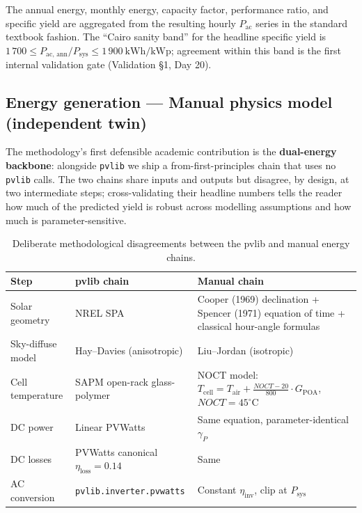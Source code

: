 The annual energy, monthly energy, capacity factor, performance
ratio, and specific yield are aggregated from the resulting hourly
$P_{\text{ac}}$ series in the standard textbook fashion. The
``Cairo sanity band'' for the headline specific yield is
$1\,700 \le P_{\text{ac, ann}} / P_{\text{sys}} \le 1\,900~\mathrm{kWh/kWp}$;
agreement within this band is the first internal validation gate
(Validation \S1, Day 20).

\subsection{Energy generation --- Manual physics model (independent twin)}
\label{sec:manual}

The methodology's first defensible academic contribution is the
\textbf{dual-energy backbone}: alongside \texttt{pvlib} we ship a
from-first-principles chain that uses no \texttt{pvlib} calls. The
two chains share inputs and outputs but disagree, by design, at two
intermediate steps; cross-validating their headline numbers tells the
reader how much of the predicted yield is robust across modelling
assumptions and how much is parameter-sensitive.

\begin{table}[!htbp]
\centering
\footnotesize
\setlength{\tabcolsep}{4pt}
\renewcommand{\arraystretch}{1.2}
\begin{tabularx}{\linewidth}{@{}l X X@{}}
\toprule
\textbf{Step} & \textbf{pvlib chain} & \textbf{Manual chain} \\
\midrule
Solar geometry    & NREL SPA \citep{nrel-spa}
                  & Cooper (1969) declination + Spencer (1971) equation of time + classical hour-angle formulas \citep{duffie} \\
Sky-diffuse model & Hay--Davies (anisotropic)
                  & Liu--Jordan (isotropic) \citep{liu1960} \\
Cell temperature  & SAPM open-rack glass-polymer
                  & NOCT model:
                    $T_{\text{cell}} = T_{\text{air}} + \frac{NOCT-20}{800} \cdot G_{\text{POA}}$,
                    $NOCT = 45^{\circ}\mathrm{C}$ \\
DC power          & Linear PVWatts
                  & Same equation, parameter-identical $\gamma_{P}$ \\
DC losses         & PVWatts canonical $\eta_{\text{loss}} = 0.14$
                  & Same \\
AC conversion     & \texttt{pvlib.inverter.pvwatts}
                  & Constant $\eta_{\text{inv}}$, clip at $P_{\text{sys}}$ \\
\bottomrule
\end{tabularx}
\caption{Deliberate methodological disagreements between the pvlib
and manual energy chains.}
\label{tab:dual}
\end{table}

